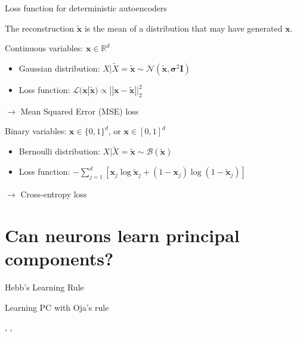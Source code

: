 \documentclass{beamer}
\begin{document}
  \begin{frame}{Loss function for deterministic autoencoders}


    The reconstruction $\tilde{\mathbf{x}}$ is the \alert{mean} of a distribution that may have generated $\mathbf{x}$.

    \begin{block}{Continuous variables: $\mathbf{x} \in \mathbb{R}^d$}
      \begin{itemize}
        \item Gaussian distribution: $X|\tilde{X} = \tilde{\mathbf{x}} \sim \mathcal{N}(\tilde{\mathbf{x}}, \mathbf{\sigma}^2 \mathbf{I})$
      \item Loss function: $\mathcal{L}(\mathbf{x}|\tilde{\mathbf{x}}) \propto ||\mathbf{x} - \tilde{\mathbf{x}}||_2^2$      
      \end{itemize}
      $\rightarrow$ \alert{Mean Squared Error (MSE) loss}
    \end{block}

    \begin{block}{Binary variables: $\mathbf{x} \in \{0,1\}^d$, or $\mathbf{x} \in [0,1]^d$}
      \begin{itemize}
        \item Bernoulli distribution: $X|\tilde{X} = \tilde{\mathbf{x}} \sim \mathcal{B}(\tilde{\mathbf{x}})$
        \item Loss function: $-\sum_{j=1}^d [\mathbf{x}_j \log \tilde{\mathbf{x}}_j + (1-\mathbf{x}_j) \log (1-\tilde{\mathbf{x}}_j)]$
      \end{itemize}
      $\rightarrow$ \alert{Cross-entropy loss}
    \end{block}
    
  \end{frame}

  \section{Can neurons learn principal components?}

  \begin{frame}{Hebb's Learning Rule}

  \end{frame}

  \begin{frame}{Learning PC with Oja's rule}

    \cite{Becker1991}, \cite{Oja1982}, \cite{Oja1992}
    
  \end{frame}
\end{document}
